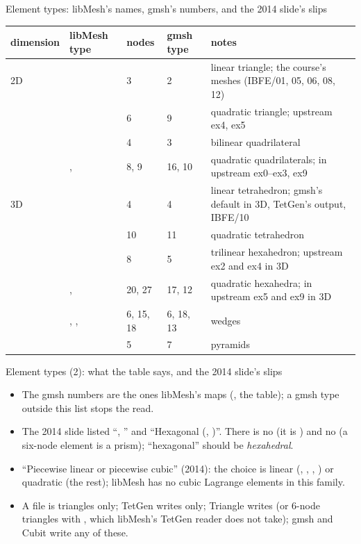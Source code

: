 \documentclass[aspectratio=169,11pt]{beamer}
\begin{document}
\begin{frame}{Element types: libMesh's names, gmsh's numbers, and the 2014 slide's slips}
\label{fr:elemtypes}
\scriptsize
\begin{tabular}{@{}llllL{0.40\textwidth}@{}}
\toprule
dimension & libMesh type & nodes & gmsh type & notes \\
\midrule
2D &  & 3 & 2 & linear triangle; the course's meshes (IBFE/01, 05, 06, 08, 12) \\
   &  & 6 & 9 & quadratic triangle; upstream ex4, ex5 \\
   &  & 4 & 3 & bilinear quadrilateral \\
   & ,  & 8, 9 & 16, 10 & quadratic quadrilaterals;  in upstream ex0--ex3, ex9 \\
3D &  & 4 & 4 & linear tetrahedron; gmsh's default in 3D, TetGen's output, IBFE/10 \\
   &  & 10 & 11 & quadratic tetrahedron \\
   &  & 8 & 5 & trilinear hexahedron; upstream ex2 and ex4 in 3D \\
   & ,  & 20, 27 & 17, 12 & quadratic hexahedra;  in upstream ex5 and ex9 in 3D \\
   & , ,  & 6, 15, 18 & 6, 18, 13 & wedges \\
   &  & 5 & 7 & pyramids \\
\bottomrule
\end{tabular}

\end{frame}

\begin{frame}{Element types (2): what the table says, and the 2014 slide's slips}
\label{fr:elemtypes2}
\footnotesize
\begin{itemize}
  \item The gmsh numbers are the ones libMesh's  maps (, the  table); a gmsh type outside this list stops the read.
  \item The 2014 slide listed ``, '' and ``Hexagonal (, )''. There is no  (it is ) and no  (a six-node element is a prism); ``hexagonal'' should be \emph{hexahedral}.
  \item ``Piecewise linear or piecewise cubic'' (2014): the choice is linear (, , , ) or quadratic (the rest); libMesh has no cubic Lagrange elements in this family.
  \item A  file is triangles only; TetGen writes  only; Triangle writes  (or 6-node triangles with , which libMesh's TetGen reader does not take); gmsh and Cubit write any of these.
\end{itemize}
\end{frame}
\end{document}
